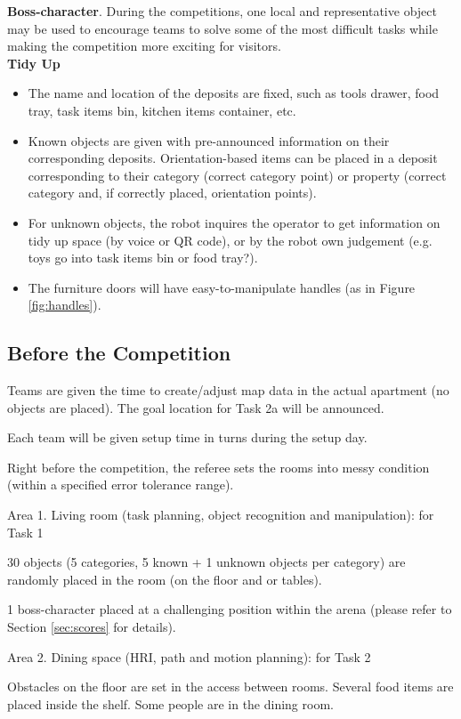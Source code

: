 \documentclass{article}
\newcommand{\SubItem}[1]{
    {\setlength\itemindent{15pt} \item[-] #1}
}
\begin{document}
\textbf{Boss-character}. During the competitions, one local and representative object may be used to encourage teams to solve some of the most difficult tasks while making the competition more exciting for visitors.\\

\textbf{Tidy Up}
\begin{itemize}
    \item The name and location of the deposits are fixed, such as tools drawer, food tray, task items bin, kitchen items container, etc.
    \item Known objects are given with pre-announced information on their corresponding deposits. Orientation-based items can be placed in a deposit corresponding to their category (correct category point) or property (correct category and, if correctly placed, orientation points).
    \item For unknown objects, the robot inquires the operator to get information on tidy up space (by voice or QR code), or by the robot own judgement (e.g. toys go into task items bin or food tray?).
    \item The furniture doors will have easy-to-manipulate handles (as in Figure \ref{fig:handles}).
\end{itemize}

\subsection{Before the Competition}

\begin{itemize}
    \item Teams are given the time to create/adjust map data in the actual apartment (no objects are placed). The goal location for Task 2a will be announced.
    \item Each team will be given setup time in turns during the setup day.
    \item Right before the competition, the referee sets the rooms into messy condition (within a specified error tolerance range).
    \item Area 1. Living room (task planning, object recognition and manipulation): for Task 1
        \SubItem{30 objects (5 categories, 5 known + 1 unknown objects per category) are randomly placed in the room (on the floor and or tables).}
        \SubItem{1 boss-character placed at a challenging position within the arena (please refer to Section \ref{sec:scores} for details).}
    \item Area 2. Dining space (HRI, path and motion planning): for Task 2
        \SubItem{Obstacles on the floor are set in the access between rooms. Several food items are placed inside the shelf. Some people are in the dining room.}
\end{itemize}
\end{document}
